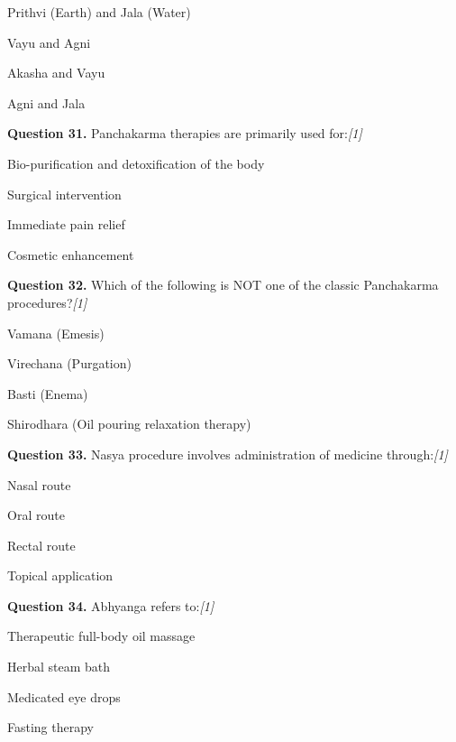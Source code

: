 \documentclass[11pt,a4paper]{article}
\newcommand{\pts}[1]{\hfill   \textit{[#1]}}
\begin{document}
\begin{parts}
  \item Prithvi (Earth) and Jala (Water)
  \item Vayu and Agni
  \item Akasha and Vayu
  \item Agni and Jala
\end{parts}

\medskip




\noindent   \textbf{Question 31.} Panchakarma therapies are primarily used for:\pts{1}

\begin{parts}
  \item Bio-purification and detoxification of the body
  \item Surgical intervention
  \item Immediate pain relief
  \item Cosmetic enhancement
\end{parts}

\medskip




\noindent   \textbf{Question 32.} Which of the following is NOT one of the classic Panchakarma procedures?\pts{1}

\begin{parts}
  \item Vamana (Emesis)
  \item Virechana (Purgation)
  \item Basti (Enema)
  \item Shirodhara (Oil pouring relaxation therapy)
\end{parts}

\medskip




\noindent   \textbf{Question 33.} Nasya procedure involves administration of medicine through:\pts{1}

\begin{parts}
  \item Nasal route
  \item Oral route
  \item Rectal route
  \item Topical application
\end{parts}

\medskip




\noindent   \textbf{Question 34.} Abhyanga refers to:\pts{1}

\begin{parts}
  \item Therapeutic full-body oil massage
  \item Herbal steam bath
  \item Medicated eye drops
  \item Fasting therapy
\end{parts}
\end{document}
